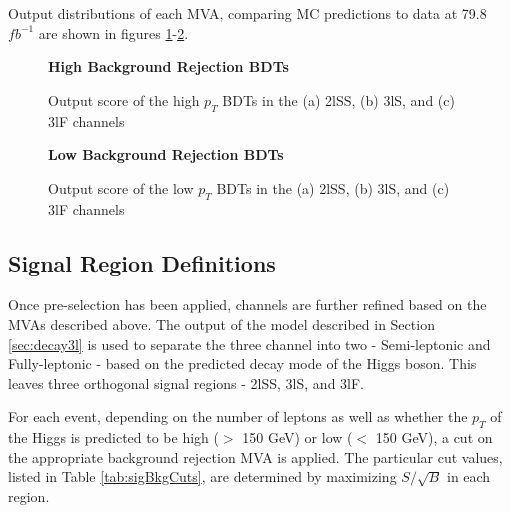 Output distributions of each MVA, comparing MC predictions to data at 79.8 $fb^{-1}$ are shown in figures \ref{fig:sigBkgScoreHigh}-\ref{fig:sigBkgScoreLow}. 

\begin{figure}
  \centering
  \textbf{High \pt Background Rejection BDTs}
  \\
  \caption{Output score of the high $p_T$ BDTs in the (a) 2lSS, (b) 3lS, and (c) 3lF channels}
  \label{fig:sigBkgScoreHigh}
\end{figure}

\begin{figure}
  \centering
  \textbf{Low \pt Background Rejection BDTs}
  \\
  \label{fig:sigBkgScoreLow}
  \caption{Output score of the low $p_T$ BDTs in the (a) 2lSS, (b) 3lS, and (c) 3lF channels} 
\end{figure}


\subsection{Signal Region Definitions}
\label{subsec:sigRegions}

Once pre-selection has been applied, channels are further refined based on the MVAs described above. The output of the model described in Section \ref{sec:decay3l} is used to separate the three channel into two - Semi-leptonic and Fully-leptonic - based on the predicted decay mode of the Higgs boson. This leaves three orthogonal signal regions - 2lSS, 3lS, and 3lF. 

For each event, depending on the number of leptons as well as whether the $p_T$ of the Higgs is predicted to be high ($>$ 150 GeV) or low ($<$ 150 GeV), a cut on the appropriate background rejection MVA is applied. The particular cut values, listed in Table \ref{tab:sigBkgCuts}, are determined by maximizing $S/\sqrt{B}$ in each region. 

